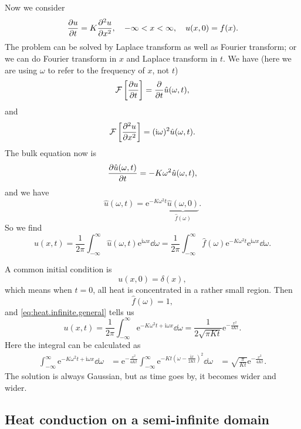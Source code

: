 \documentclass[hyperref, a4paper]{article}
\newcommand*{\ii}{\mathrm{i}}
\newcommand*{\ee}{\mathrm{e}}
\def\\{}%
\newcommand*{\fourier}{\mathcal{F}}
\newcommand*{\inftoinf}{\int_{-\infty}^{\infty}}
\begin{document}
Now we consider 
\begin{equation}
    \pdv{u}{t} = K \pdv[2]{u}{x}, \quad -\infty < x < \infty, \quad u(x, 0) = f(x).
\end{equation}
The problem can be solved by Laplace transform as well as Fourier transform; 
or we can do Fourier transform in $x$ 
and Laplace transform in $t$.
We have (here we are using $\omega$ to refer to the frequency of $x$, not $t$)
\[
    \fourier \left[\pdv{u}{t}\right] = \pdv{t} \hat{u}(\omega, t),
\]
and 
\[
    \fourier\left[\pdv[2]{u}{x}\right] 
    = (\ii \omega)^2 \hat{u}(\omega, t).
\]
The bulk equation now is 
\[
    \pdv{\hat{u}(\omega, t)}{t} = - K \omega^2 \hat{u}(\omega, t) ,
\]
and we have 
\[
    \hat{u}(\omega , t) = \ee^{- K \omega^2 t} \underbrace{\hat{u}(\omega, 0)}_{\hat{f}(\omega)}.
\] 
So we find 
\begin{equation}
    u(x, t) = \frac{1}{2\pi} \inftoinf \hat{u}(\omega, t) \ee^{\ii \omega x} \dd{\omega}
    = \frac{1}{2\pi} \inftoinf \hat{f}(\omega) \ee^{- K \omega^2 t} \ee^{\ii \omega x} \dd{\omega}.
    \label{eq:heat.infinite.general}
\end{equation}

A common initial condition is 
\begin{equation}
    u(x, 0) = \delta(x),
\end{equation}
which means when $t = 0$, 
all heat is concentrated in a rather small region.
Then 
\[
    \hat{f}(\omega) = 1,
\]
and \eqref{eq:heat.infinite.general} tells us 
\begin{equation}
    u(x, t) = \frac{1}{2\pi} \inftoinf \ee^{- K \omega^2 t + \ii \omega x} \dd{\omega} 
    = \frac{1}{2 \sqrt{\pi K t}}  \ee^{- \frac{x^2}{4 K t}} .
\end{equation}
Here the integral can be calculated as 
\[
    \begin{aligned}
        \inftoinf \ee^{- K \omega^2 t + \ii \omega x} \dd{\omega} 
        &= \ee^{- \frac{x^2}{4 K t}} \inftoinf 
            \ee^{- K t \left(
                \omega - \frac{\ii x}{2 K t}
            \right)^2 } \dd{\omega} \\
        &= \sqrt{\frac{\pi}{Kt}} \ee^{- \frac{x^2}{4 K t}} .
    \end{aligned}
\]
The solution is always Gaussian, 
but as time goes by, 
it becomes wider and wider.

\subsection{Heat conduction on a semi-infinite domain}
\end{document}
